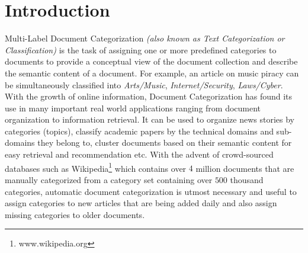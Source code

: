 \chapter{Introduction}
\label{chapter:introduction}



Multi-Label Document Categorization \emph{(also known as Text Categorization or Classification)} is the task of assigning one or more predefined categories to documents to provide a conceptual view of the document collection and describe the semantic content of a document. For example, an article on music piracy can be simultaneously classified into \emph{Arts/Music}, \emph{Internet/Security}, \emph{Laws/Cyber}.    
With the growth of online information, Document Categorization has found its use in many important real world applications ranging from document organization to information retrieval. It can be used to organize news stories by categories (topics), classify academic papers by the technical domains and sub-domains they belong to, cluster documents based on their semantic content for easy retrieval and recommendation etc.
With the advent of crowd-sourced databases such as Wikipedia\footnote{www.wikipedia.org} which contains over $4$ million documents that are manually categorized from a category set containing over $500$ thousand categories, automatic document categorization is utmost necessary and useful to assign categories to new articles that are being added daily and also assign missing categories to older documents.

